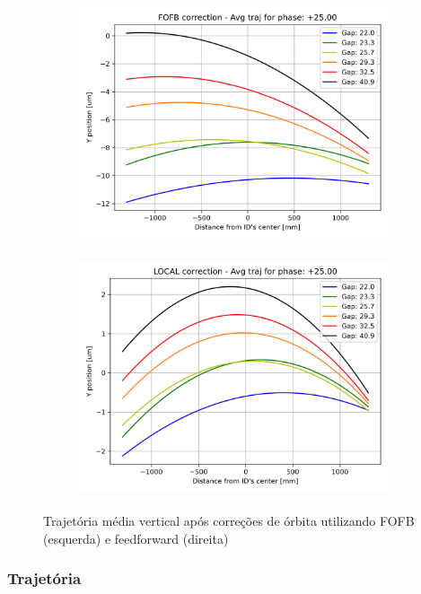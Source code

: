 \documentclass[a4paper,12pt]{article}
\begin{document}
\begin{figure}[H]
\begin{subfigure}{0.5\textwidth}
\includegraphics[width=0.9\linewidth, height=7cm]{figs/phase25 vertical-avg-traj-FOFB.png} 
\label{fig:subim10yc25}
\end{subfigure}
\begin{subfigure}{0.5\textwidth}
\includegraphics[width=0.9\linewidth, height=7cm]{figs/phase25 vertical-avg-traj-LOCAL.png}
\label{fig:subim20yc25}
\end{subfigure}
\caption{Trajetória média vertical após correções de órbita utilizando FOFB (esquerda) e feedforward (direita)}
\label{fig:25corry}
\end{figure}



\subsubsection{Trajetória}
\end{document}
